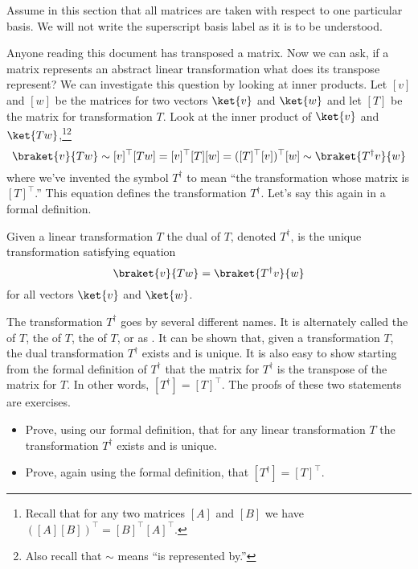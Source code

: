 
Assume in this section that all matrices are taken with respect to one particular basis.
We will not write the superscript basis label as it is to be understood.

Anyone reading this document has transposed a matrix.
Now we can ask, if a matrix represents an abstract linear transformation what does its transpose represent?
We can investigate this question by looking at inner products.
Let $[v]$ and $[w]$ be the matrices for two vectors $\ket{v}$ and $\ket{w}$ and let $[T]$ be the matrix for transformation $T$.
Look at the inner product of $\ket{v}$ and $\ket{Tw}$,\footnote{Recall that for any two matrices $[A]$ and $[B]$ we have $ ([A][B])^{\top} = [B]^{\top}[A]^{\top}$.}\footnote{Also recall that $\sim$ means ``is represented by.''}
\begin{displaymath}
  \braket{v}{Tw} \sim [v]^{\top}[Tw] = [v]^{\top}[T][w] = ([T]^{\top}[v])^{\top}[w] \sim \braket{T^{\dag}v}{w}
\end{displaymath}
where we've invented the symbol $T^{\dag}$ to mean ``the transformation whose matrix is $[T]^{\top}$.''
This equation defines the transformation $T^{\dag}$.
Let's say this again in a formal definition.

\begin{definition}
Given a linear transformation $T$ the dual of $T$, denoted $T^{\dag}$, is the unique transformation satisfying equation
\begin{displaymath}
  \braket{v}{Tw} = \braket{T^{\dag}v}{w}
\end{displaymath}
for all vectors $\ket{v}$ and $\ket{w}$.
\end{definition}
The transformation $T^\dag$ goes by several different names.
It is alternately called the  of $T$, the  of $T$, the  of $T$, or as .
It can be shown that, given a transformation $T$, the dual transformation $T^{\dag}$ exists and is unique.
It is also easy to show starting from the formal definition of $T^\dag$ that the matrix for $T^\dag$ is the transpose of the matrix for $T$.
In other words, \mbox{$[T^{\dag}] = [T]^{\top}$.}
The proofs of these two statements are exercises.

\begin{itemize}
  \item[1.] Prove, using our formal definition, that for any linear transformation $T$ the transformation $T^{\dag}$ exists and is unique.
  \item[2.] Prove, again using the formal definition, that $[T^{\dag}] = [T]^{\top}$.
\end{itemize}

